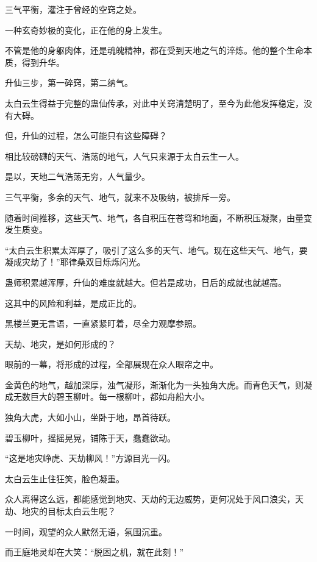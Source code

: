 \begin{this_body}
三气平衡，灌注于曾经的空窍之处。

一种玄奇妙极的变化，正在他的身上发生。

不管是他的身躯肉体，还是魂魄精神，都在受到天地之气的淬炼。他的整个生命本质，得到升华。

升仙三步，第一碎窍，第二纳气。

太白云生得益于完整的蛊仙传承，对此中关窍清楚明了，至今为此他发挥稳定，没有大碍。

但，升仙的过程，怎么可能只有这些障碍？

相比较磅礴的天气、浩荡的地气，人气只来源于太白云生一人。

是以，天地二气浩荡无穷，人气量少。

三气平衡，多余的天气、地气，就来不及吸纳，被排斥一旁。

随着时间推移，这些天气、地气，各自积压在苍穹和地面，不断积压凝聚，由量变发生质变。

“太白云生积累太浑厚了，吸引了这么多的天气、地气。现在这些天气、地气，要凝成灾劫了！”耶律桑双目烁烁闪光。

蛊师积累越浑厚，升仙的难度就越大。但若是成功，日后的成就也就越高。

这其中的风险和利益，是成正比的。

黑楼兰更无言语，一直紧紧盯着，尽全力观摩参照。

天劫、地灾，是如何形成的？

眼前的一幕，将形成的过程，全部展现在众人眼帘之中。

金黄色的地气，越加深厚，浊气凝形，渐渐化为一头独角大虎。而青色天气，则凝成无数巨大的碧玉柳叶。每一根柳叶，都如舟船大小。

独角大虎，大如小山，坐卧于地，昂首待跃。

碧玉柳叶，摇摇晃晃，铺陈于天，蠢蠢欲动。

“这是地灾峥虎、天劫柳风！”方源目光一闪。

太白云生止住狂笑，脸色凝重。

众人离得这么远，都能感觉到地灾、天劫的无边威势，更何况处于风口浪尖，天劫、地灾的目标太白云生呢？

一时间，观望的众人默然无语，氛围沉重。

而王庭地灵却在大笑：“脱困之机，就在此刻！”

\end{this_body}

